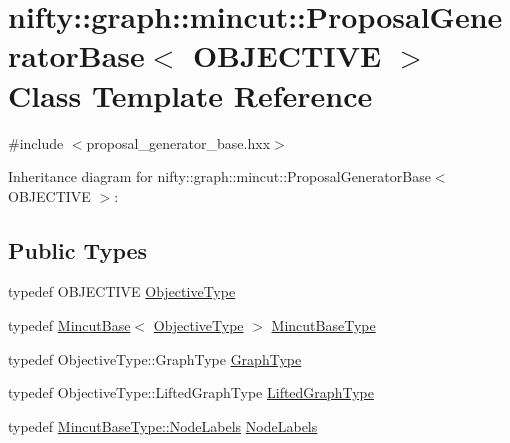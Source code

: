 \hypertarget{classnifty_1_1graph_1_1mincut_1_1ProposalGeneratorBase}{}\section{nifty\+:\+:graph\+:\+:mincut\+:\+:Proposal\+Generator\+Base$<$ O\+B\+J\+E\+C\+T\+I\+V\+E $>$ Class Template Reference}
\label{classnifty_1_1graph_1_1mincut_1_1ProposalGeneratorBase}


{\ttfamily \#include $<$proposal\+\_\+generator\+\_\+base.\+hxx$>$}



Inheritance diagram for nifty\+:\+:graph\+:\+:mincut\+:\+:Proposal\+Generator\+Base$<$ O\+B\+J\+E\+C\+T\+I\+V\+E $>$\+:
\subsection*{Public Types}
\begin{DoxyCompactItemize}
\item 
typedef O\+B\+J\+E\+C\+T\+I\+V\+E \hyperlink{classnifty_1_1graph_1_1mincut_1_1ProposalGeneratorBase_ae58cbf5728a4180f1727b5df81c127cf}{Objective\+Type}
\item 
typedef \hyperlink{classnifty_1_1graph_1_1MincutBase}{Mincut\+Base}$<$ \hyperlink{classnifty_1_1graph_1_1mincut_1_1ProposalGeneratorBase_ae58cbf5728a4180f1727b5df81c127cf}{Objective\+Type} $>$ \hyperlink{classnifty_1_1graph_1_1mincut_1_1ProposalGeneratorBase_a679c596a0ac3515d58b4ebd6cc643858}{Mincut\+Base\+Type}
\item 
typedef Objective\+Type\+::\+Graph\+Type \hyperlink{classnifty_1_1graph_1_1mincut_1_1ProposalGeneratorBase_aa652360093005592c3899117e129847c}{Graph\+Type}
\item 
typedef Objective\+Type\+::\+Lifted\+Graph\+Type \hyperlink{classnifty_1_1graph_1_1mincut_1_1ProposalGeneratorBase_a0d24cbda65bb608f0b74e1316f0317a2}{Lifted\+Graph\+Type}
\item 
typedef \hyperlink{classnifty_1_1graph_1_1MincutBase_a9dc6555e37d38de23f194f87ca1497d5}{Mincut\+Base\+Type\+::\+Node\+Labels} \hyperlink{classnifty_1_1graph_1_1mincut_1_1ProposalGeneratorBase_aa0c91c4d0f598763fdd2ae46ebd06437}{Node\+Labels}
\end{DoxyCompactItemize}
